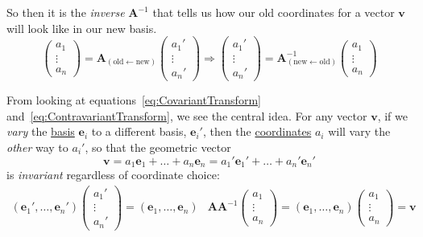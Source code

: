 \documentclass[../master.tex]{subfiles}
\begin{document}
	So then it is the \emph{inverse} $\mathbf A^{-1}$ that tells us how our old coordinates for a vector $\mathbf v$ will look like in our new basis.
	\begin{equation}\label{eq:ContravariantTransform}
		\begin{pmatrix}
			a_1\\
			\vdots\\
			a_n
		\end{pmatrix} 
		= \mathbf A_{(\mathrm{old} \leftarrow \mathrm{new})} 
		\begin{pmatrix}
			a_1'\\
			\vdots\\
			a_n'
		\end{pmatrix} \Rightarrow 
		\begin{pmatrix}
			a_1'\\
			\vdots\\
			a_n'
		\end{pmatrix} = 
		 \mathbf A^{-1}_{(\mathrm{new} \leftarrow \mathrm{old})}
		\begin{pmatrix}
			a_1\\
			\vdots\\
			a_n
		\end{pmatrix}
	\end{equation}

	From looking at equations~\eqref{eq:CovariantTransform} and~\eqref{eq:ContravariantTransform}, we see the central idea. For any vector $\mathbf v$, if we \emph{vary} the \underline{basis} $\mathbf e_i$ to a different basis, $\mathbf e_i'$, then the \underline{coordinates} $a_i$ will vary  the \emph{other} way to $a_i'$, so that the geometric vector
	\begin{equation*}
		\mathbf v = a_1 \mathbf e_1 + \dots + a_n \mathbf e_n = a_1' \mathbf e_1' + \dots + a_n' \mathbf e_n'
	\end{equation*} is \emph{invariant} regardless of coordinate choice:
	\begin{equation*}
		\begin{aligned}
			(\mathbf e_1', \dots, \mathbf e_n') 
			\begin{pmatrix}
				a_1' \\ \vdots \\ a_n'
			\end{pmatrix} 
			= (\mathbf e_1, \dots, \mathbf e_n ) & \mathbf A \mathbf A^{-1} 
			\begin{pmatrix}
				a_1 \\ \vdots \\ a_n
			\end{pmatrix}
			= (\mathbf e_1, \dots, \mathbf e_n ) 
			\begin{pmatrix}
				a_1 \\ \vdots \\ a_n
			\end{pmatrix} = \mathbf v
		\end{aligned}
	\end{equation*}
\end{document}

